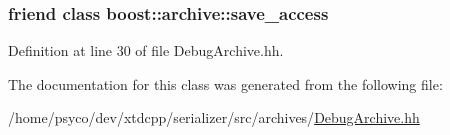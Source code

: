 \subsubsection[{\texorpdfstring{boost\+::archive\+::save\+\_\+access}{boost::archive::save_access}}]{\setlength{\rightskip}{0pt plus 5cm}friend class boost\+::archive\+::save\+\_\+access\hspace{0.3cm}{\ttfamily [friend]}}\hypertarget{classxtd_1_1serializer_1_1DebugXmlOArchive_aaca003bb8a4fc59424e4025130da4edd}{}\label{classxtd_1_1serializer_1_1DebugXmlOArchive_aaca003bb8a4fc59424e4025130da4edd}


Definition at line 30 of file Debug\+Archive.\+hh.



The documentation for this class was generated from the following file\+:\begin{DoxyCompactItemize}
\item 
/home/psyco/dev/xtdcpp/serializer/src/archives/\hyperlink{DebugArchive_8hh}{Debug\+Archive.\+hh}\end{DoxyCompactItemize}
